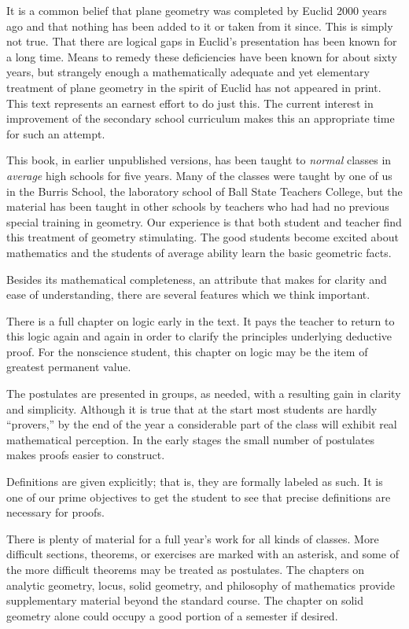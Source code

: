 \documentclass[11pt]{book}
\begin{document}
It is a common belief that plane geometry was completed by Euclid 2000 years ago
and that nothing has been added to it or taken from it since. This is simply not
true. That there are logical gaps in Euclid's presentation has been known for a
long time. Means to remedy these deficiencies have been known for about sixty
years, but strangely enough a mathematically adequate and yet elementary
treatment of plane geometry in the spirit of Euclid has not appeared in print.
This text represents an earnest effort to do just this. The current interest in
improvement of the secondary school curriculum makes this an appropriate time
for such an attempt.

This book, in earlier unpublished versions, has been taught to \emph{normal}
classes in \emph{average} high schools for five years. Many of the classes were
taught by one of us in the Burris School, the laboratory school of Ball State
Teachers College, but the material has been taught in other schools by teachers
who had had no previous special training in geometry. Our experience is that
both student and teacher find this treatment of geometry stimulating. The good
students become excited about mathematics and the students of average ability
learn the basic geometric facts.

Besides its mathematical completeness, an attribute that makes for clarity and
ease of understanding, there are several features which we think important.

There is a full chapter on logic early in the text. It pays the teacher to
return to this logic again and again in order to clarify the principles
underlying deductive proof. For the nonscience student, this chapter on logic
may be the item of greatest permanent value.

The postulates are presented in groups, as needed, with a resulting gain in
clarity and simplicity. Although it is true that at the start most students are
hardly ``provers,'' by the end of the year a considerable part of the class will
exhibit real mathematical perception. In the early stages the small number of
postulates makes proofs easier to construct.

Definitions are given explicitly; that is, they are formally labeled as such. It
is one of our prime objectives to get the student to see that precise
definitions are necessary for proofs.

There is plenty of material for a full year's work for all kinds of classes.
More difficult sections, theorems, or exercises are marked with an asterisk, and
some of the more difficult theorems may be treated as postulates. The chapters
on analytic geometry, locus, solid geometry, and philosophy of mathematics
provide supplementary material beyond the standard course. The chapter on solid
geometry alone could occupy a good portion of a semester if desired.
\end{document}
